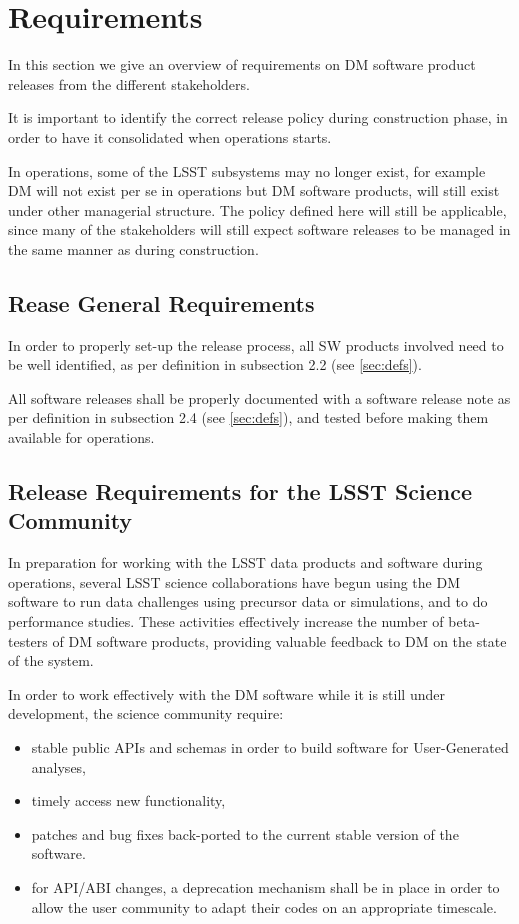 \section{Requirements} \label{sec:reqs}

In this section we give an overview of requirements on \gls{DM} software product releases from the different stakeholders.

It is important to identify the correct release policy during construction phase, in order to have it consolidated when operations starts.

In operations, some of the \gls{LSST} subsystems may no longer exist, for example \gls{DM} will not exist per se in operations but \gls{DM} software products, will still exist under other managerial structure.
The policy defined here will still be applicable, since many of the stakeholders will still expect software releases to be managed in the same manner as during construction.


\subsection{Rease General Requirements} \label{sec:genreq}

In order to properly set-up the release process, all \gls{SW} products involved need to be well identified, as per definition in  subsection 2.2 (see \ref{sec:defs}).

All software releases shall be properly documented with a software release note as per definition in  subsection 2.4 (see \ref{sec:defs}), and tested before making them available for operations.


\subsection{Release Requirements for the \gls{LSST} Science Community} \label{sec:comreqs}

In preparation for working with the \gls{LSST} data products and software during operations, several \gls{LSST} science collaborations have begun using the \gls{DM} software to run data challenges using precursor data or simulations, and to do performance studies. These activities effectively increase the number of beta-testers of \gls{DM} software products, providing valuable feedback to \gls{DM} on the state of the system. 

In order to work effectively with the \gls{DM} software while it is still under development, the science community require: 
\begin{itemize}
\item stable public APIs and schemas in order to build software for User-Generated analyses, 
\item timely access new functionality,  
\item patches and bug fixes back-ported to the current stable version of the software. 
\item for API/ABI changes, a deprecation mechanism shall be in place in order to allow the user community to adapt their codes on an appropriate timescale.
\end{itemize}


